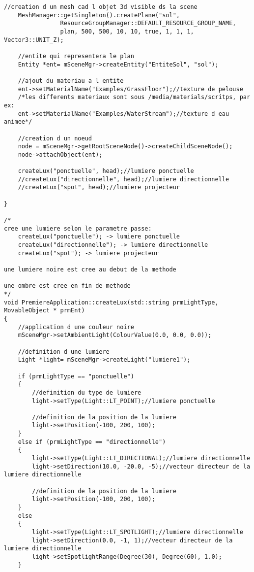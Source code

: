 \begin{lstlisting}[caption={PremiereApplication.cpp}]
    //creation d un mesh cad l objet 3d visible ds la scene
    MeshManager::getSingleton().createPlane("sol",
                ResourceGroupManager::DEFAULT_RESOURCE_GROUP_NAME,
                plan, 500, 500, 10, 10, true, 1, 1, 1, Vector3::UNIT_Z); 

    //entite qui representera le plan
    Entity *ent= mSceneMgr->createEntity("EntiteSol", "sol");

    //ajout du materiau a l entite
    ent->setMaterialName("Examples/GrassFloor");//texture de pelouse
    /*les differents materiaux sont sous /media/materials/scritps, par ex:
    ent->setMaterialName("Examples/WaterStream");//texture d eau animee*/

    //creation d un noeud
    node = mSceneMgr->getRootSceneNode()->createChildSceneNode();
    node->attachObject(ent);

    createLux("ponctuelle", head);//lumiere ponctuelle
    //createLux("directionnelle", head);//lumiere directionnelle
    //createLux("spot", head);//lumiere projecteur

}

/*
cree une lumiere selon le parametre passe:
    createLux("ponctuelle"); -> lumiere ponctuelle
    createLux("directionnelle"); -> lumiere directionnelle
    createLux("spot"); -> lumiere projecteur

une lumiere noire est cree au debut de la methode

une ombre est cree en fin de methode
*/
void PremiereApplication::createLux(std::string prmLightType, MovableObject * prmEnt)
{
    //application d une couleur noire
    mSceneMgr->setAmbientLight(ColourValue(0.0, 0.0, 0.0)); 

    //definition d une lumiere 
    Light *light= mSceneMgr->createLight("lumiere1");

    if (prmLightType == "ponctuelle")
    {
        //definition du type de lumiere
        light->setType(Light::LT_POINT);//lumiere ponctuelle

        //definition de la position de la lumiere
        light->setPosition(-100, 200, 100);
    }
    else if (prmLightType == "directionnelle")
    {
        light->setType(Light::LT_DIRECTIONAL);//lumiere directionnelle
        light->setDirection(10.0, -20.0, -5);//vecteur directeur de la lumiere directionnelle

        //definition de la position de la lumiere
        light->setPosition(-100, 200, 100);
    }
    else
    {
        light->setType(Light::LT_SPOTLIGHT);//lumiere directionnelle
        light->setDirection(0.0, -1, 1);//vecteur directeur de la lumiere directionnelle
        light->setSpotlightRange(Degree(30), Degree(60), 1.0);
    }


\end{lstlisting}
